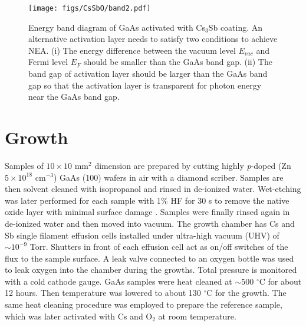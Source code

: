 



\begin{figure}
	\centering
	\texttt{[image: figs/CsSbO/band2.pdf]}
	\caption{Energy band diagram of GaAs activated with Cs$_3$Sb coating. An alternative activation layer needs to satisfy two conditions to achieve NEA. (i) The energy difference between the vacuum level $E_{vac}$ and Fermi level $E_F$ should be smaller than the GaAs band gap. (ii) The band gap of activation layer should be larger than the GaAs band gap so that the activation layer is transparent for photon energy near the GaAs band gap.}
	\label{fig_band}
\end{figure}

\section{Growth}

Samples of $10\times10$ mm$^2$ dimension are prepared by cutting highly \emph{p}-doped (Zn $5\times 10^{18} \textrm{ cm}^{-3}$) GaAs (100) wafers in air with a diamond scriber. Samples are then solvent cleaned with isopropanol and rinsed in de-ionized water. Wet-etching was later performed for each sample with 1\% HF for 30 s to remove the native oxide layer with minimal surface damage \cite{reiVilar2005,feng2019_etching}. Samples were finally rinsed again in de-ionized water and then moved into vacuum. 
The growth chamber has Cs and Sb single filament effusion cells \cite{cultrera2014_alkali} installed under ultra-high vacuum (UHV) of $\sim 10^{-9}$ Torr. Shutters in front of each effusion cell act as on/off switches of the flux to the sample surface. A leak valve connected to an oxygen bottle was used to leak oxygen into the chamber during the growths. Total pressure is monitored with a cold cathode gauge. GaAs samples were heat cleaned at $\sim 500$ $^\circ$C for about 12 hours. Then temperature was lowered to about 130 $^\circ$C for the growth.
The same heat cleaning procedure was employed to prepare the reference sample, which was later activated with Cs and O$_2$ at room temperature.


